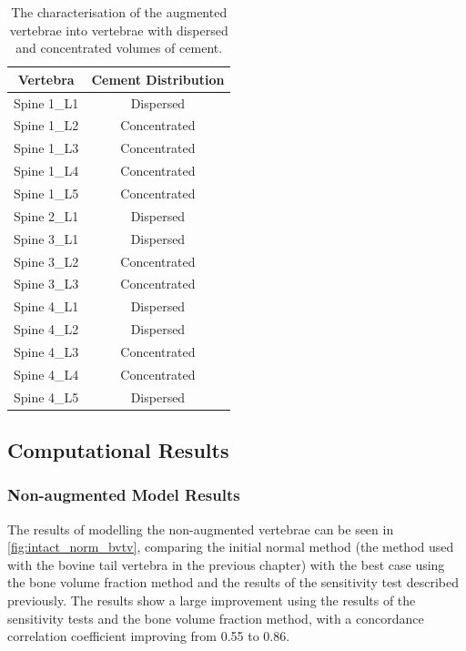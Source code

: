 \begin{table}[h!]
	\caption{The characterisation of the augmented vertebrae into vertebrae with dispersed and concentrated volumes of cement.}
	\label{tab:conc_disp}
	\centering
	\begin{tabular}{c|c}
    Vertebra & Cement Distribution \\
    \hline
    \hline

    Spine 1\_L1 & Dispersed \\
    Spine 1\_L2 & Concentrated\\
    Spine 1\_L3 & Concentrated\\
    Spine 1\_L4 & Concentrated\\
    Spine 1\_L5 & Concentrated\\
    Spine 2\_L1 & Dispersed \\
    Spine 3\_L1 & Dispersed \\
    Spine 3\_L2 & Concentrated\\
    Spine 3\_L3 & Concentrated\\
    Spine 4\_L1 & Dispersed \\
    Spine 4\_L2 & Dispersed \\
    Spine 4\_L3 & Concentrated\\
    Spine 4\_L4 & Concentrated\\
    Spine 4\_L5 & Dispersed \\
    \hline
	\end{tabular}
\end{table}



\subsection{Computational Results}


\subsubsection{Non-augmented Model Results}

The results of modelling the non-augmented vertebrae can be seen in \cref{fig:intact_norm_bvtv}, comparing the initial normal method (the method used with the bovine tail vertebra in the previous chapter) with the best case using the bone volume fraction method and the results of the sensitivity test described previously.
The results show a large improvement using the results of the sensitivity tests and the bone volume fraction method, with a concordance correlation coefficient improving from 0.55 to 0.86.

